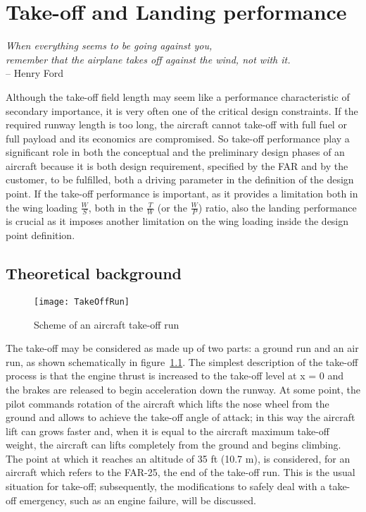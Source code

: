 \chapter{Take-off and Landing performance}
\label{chap:TakeOff}

\begin{flushright}
	{\smaller
		\textit{When everything seems to be going against you, \\ remember that the airplane takes off against the wind, not with it.}\\
		-- Henry Ford}
\end{flushright}

\noindent
Although the take-off field length may seem like a performance characteristic of secondary importance, it is very often one of the critical design constraints. If the required runway length is too long, the aircraft cannot take-off with full fuel or full payload and its economics are compromised.
%
So take-off performance play a significant role in both the conceptual and the preliminary design phases of an aircraft because it is both design requirement, specified by the \gls{FAR} and by the customer, to be fulfilled, both a driving parameter in the definition of the design point. If the take-off performance is important, as it provides a limitation both in the wing loading $\frac{W}{S}$, both in the $\frac{T}{W}$ (or the $\frac{W}{P}$) ratio, also the landing performance is crucial as it imposes another limitation on the wing loading inside the design point definition.
%
\section{Theoretical background}
%
\begin{figure}[!t]
\centering
\texttt{[image: TakeOffRun]}
\caption{Scheme of an aircraft take-off run}
\label{fig:TOrun}
\end{figure}
%
The take-off may be considered as made up of two parts: a ground run and an air run, as shown schematically in figure~\ref{fig:TOrun}. The simplest description of the take-off process is that the engine thrust is increased to the take-off level at x = 0 and the brakes are released to begin acceleration down the runway. At some point, the pilot commands rotation of the aircraft which lifts the nose wheel from the ground and allows to achieve the take-off angle of attack; in this way the aircraft lift can grows faster and, when it is equal to the aircraft maximum take-off weight, the aircraft can lifts completely from the ground and begins climbing. The point at which it reaches an altitude of 35 \si{ft} (10.7 \si{\meter}), is considered, for an aircraft which refers to the \gls{FAR}-25, the end of the take-off run. 
%
This is the usual situation for take-off; subsequently, the modifications to safely deal with a take-off emergency, such as an engine failure, will be discussed.
%
